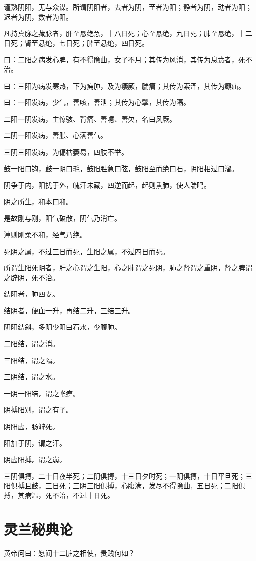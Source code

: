 \documentclass{article}%
\begin{document}
谨熟阴阳，无与众谋。所谓阴阳者，去者为阴，至者为阳；静者为阴，动者为阳；迟者为阴，数者为阳。

凡持真脉之藏脉者，肝至悬绝急，十八日死；心至悬绝，九日死；肺至悬绝，十二日死；肾至悬绝，七日死；脾至悬绝，四日死。

曰：二阳之病发心脾，有不得隐曲，女子不月；其传为风消，其传为息贲者，死不治。

曰：三阳为病发寒热，下为痈肿，及为痿厥，腨㾓；其传为索泽，其传为㿗疝。

曰：一阳发病，少气，善咳，善泄；其传为心掣，其传为隔。

二阳一阴发病，主惊骇、背痛、善噫、善欠，名曰风厥。

二阴一阳发病，善胀、心满善气。

三阴三阳发病，为偏枯萎易，四肢不举。

鼓一阳曰钩，鼓一阴曰毛，鼓阳胜急曰弦，鼓阳至而绝曰石，阴阳相过曰溜。

阴争于内，阳扰于外，魄汗未藏，四逆而起，起则熏肺，使人喘鸣。

阴之所生，和本曰和。

是故刚与刚，阳气破散，阴气乃消亡。

淖则刚柔不和，经气乃绝。

死阴之属，不过三日而死，生阳之属，不过四日而死。

所谓生阳死阴者，肝之心谓之生阳，心之肺谓之死阴，肺之肾谓之重阴，肾之脾谓之辟阴，死不治。

结阳者，肿四支。

结阴者，便血一升，再结二升，三结三升。

阴阳结斜，多阴少阳曰石水，少腹肿。

二阳结，谓之消。

三阳结，谓之隔。

三阴结，谓之水。

一阴一阳结，谓之喉痹。

阴搏阳别，谓之有子。

阴阳虚，肠澼死。

阳加于阴，谓之汗。

阴虚阳搏，谓之崩。

三阴俱搏，二十日夜半死；二阴俱搏，十三日夕时死；一阴俱搏，十日平旦死；三阳俱搏且鼓，三日死；三阴三阳俱搏，心腹满，发尽不得隐曲，五日死；二阳俱搏，其病温，死不治，不过十日死。


\section{灵兰秘典论}
黄帝问曰：愿闻十二脏之相使，贵贱何如？
\end{document}
